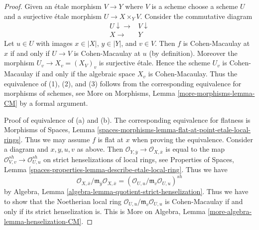\begin{proof}
Given an \'etale morphism $V \to Y$ where $V$ is a scheme
choose a scheme $U$ and a surjective \'etale morphism $U \to X \times_Y V$.
Consider the commutative diagram
$$
\begin{array}{cc}U \downarrow\longrightarrow & V \downarrow \\ X \longrightarrow & Y\end{array}
$$
Let $u \in U$ with images $x \in |X|$, $y \in |Y|$, and $v \in V$.
Then $f$ is Cohen-Macaulay at $x$ if and only if $U \to V$ is
Cohen-Macaulay at $u$ (by definition). Moreover the morphism
$U_v \to X_v = (X_V)_v$ is surjective \'etale. Hence the scheme $U_v$ is
Cohen-Macaulay if and only if the algebraic space $X_v$ is Cohen-Macaulay.
Thus the equivalence of (1), (2), and (3) follows from the
corresponding equivalence for morphisms of
schemes, see More on Morphisms, Lemma \ref{more-morphisms-lemma-CM}
by a formal argument.

\medskip\noindent
Proof of equivalence of (a) and (b). The corresponding equivalence
for flatness is Morphisms of Spaces, Lemma
\ref{spaces-morphisms-lemma-flat-at-point-etale-local-rings}.
Thus we may assume $f$ is flat at $x$ when proving the equivalence.
Consider a diagram and $x, y, u, v$ as above. Then
$\mathcal{O}_{Y, \overline{y}} \to \mathcal{O}_{X, \overline{x}}$
is equal to the map
$\mathcal{O}_{V, v}^{sh} \to \mathcal{O}_{U, u}^{sh}$
on strict henselizations of local rings, see
Properties of Spaces, Lemma
\ref{spaces-properties-lemma-describe-etale-local-ring}.
Thus we have
$$
\mathcal{O}_{X, \overline{x}}/
\mathfrak m_{\overline{y}}\mathcal{O}_{X, \overline{x}} =
(\mathcal{O}_{U, u}/\mathfrak m_v \mathcal{O}_{U, u})^{sh}
$$
by Algebra, Lemma \ref{algebra-lemma-quotient-strict-henselization}.
Thus we have to show that the Noetherian local ring
$\mathcal{O}_{U, u}/\mathfrak m_v \mathcal{O}_{U, u}$
is Cohen-Macaulay if and only if its strict henselization is.
This is More on Algebra, Lemma \ref{more-algebra-lemma-henselization-CM}.
\end{proof}


